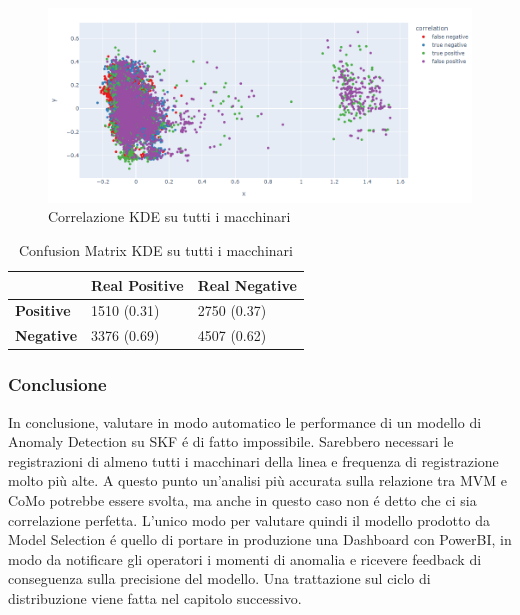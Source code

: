 \begin{figure}[t]
	\centering
	\includegraphics[width=14cm, scale=1]{images/correlation_all_quality_plot.png}
	\caption{Correlazione KDE su tutti i macchinari}
	\label{quality_all_machines}
\end{figure}

\begin{table}[]
	\centering
	\begin{tabular}{|l|l|l|}
		\hline
		                  & \textbf{Real Positive} & \textbf{Real Negative} \\ \hline
		\textbf{Positive} & 1510 (0.31)            & 2750 (0.37)            \\ \hline
		\textbf{Negative} & 3376 (0.69)            & 4507 (0.62)            \\ \hline
	\end{tabular}
	\caption{\label{cm_quality_all}Confusion Matrix KDE su tutti i macchinari}
	
\end{table}

\subsubsection{Conclusione}
In conclusione, valutare in modo automatico le performance di un modello di Anomaly Detection su SKF é di fatto impossibile. Sarebbero necessari le registrazioni di almeno tutti i macchinari della linea e frequenza di registrazione molto più alte. A questo punto un'analisi più accurata sulla relazione tra MVM e CoMo potrebbe essere svolta, ma anche in questo caso non é detto che ci sia correlazione perfetta.
L'unico modo per valutare quindi il modello prodotto da Model Selection é quello di portare in produzione una Dashboard con PowerBI, in modo da notificare gli operatori i momenti di anomalia e ricevere feedback di conseguenza sulla precisione del modello.
Una trattazione sul ciclo di distribuzione viene fatta nel capitolo successivo.
